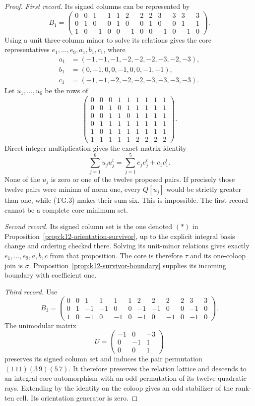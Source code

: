 \begin{proof}
\emph{First record.}
Its signed columns can be represented by
\[
B_1=\begin{pmatrix}
0&0&1&1&1&2&2&2&3&3&3&3\\
0&1&0&0&1&0&0&1&0&0&1&1\\
1&0&-1&0&0&-1&0&0&-1&0&-1&0
\end{pmatrix}.
\]
Using a unit three-column minor to solve its relations gives
the core representatives $e_1,\ldots,e_9,a_1,b_1,c_1$, where
\[
\begin{split}
a_1&=(-1,-1,-1,-2,-2,-2,-3,-2,-3),\\
b_1&=(0,-1,0,0,-1,0,0,-1,-1),\\
c_1&=(-1,-1,-2,-2,-2,-3,-3,-3,-3).
\end{split}
\]
Let $u_1,\ldots,u_6$ be the rows of
\[
\begin{pmatrix}
0&0&0&1&1&1&1&1&1\\
0&0&1&0&1&1&1&1&1\\
0&0&1&1&0&1&1&1&1\\
0&1&1&1&1&1&1&1&1\\
1&0&1&1&1&1&1&1&1\\
1&1&1&1&1&2&2&2&2
\end{pmatrix}.
\]
Direct integer multiplication gives the exact matrix identity
\[
 \sum_{j=1}^6u_ju_j^t
     =\sum_{j=1}^5e_je_j^t+c_1c_1^t.                   \tag{TG.3}
\]
None of the $u_j$ is zero or one of the twelve proposed pairs.
If precisely those twelve pairs were minima of norm one,
every $Q[u_j]$ would be strictly greater than one, while
(TG.3) makes their sum six. This is impossible. The first
record cannot be a complete core minimum set.

\emph{Second record.}
Its signed column set is the one denoted $(*)$ in
Proposition~\ref{prop:k12-orientation-survivor}, up to the
explicit integral basis change and ordering checked there.
Solving its unit-minor relations gives exactly
$e_1,\ldots,e_9,a,b,c$ from that proposition. The core is
therefore $\tau$ and its one-coloop join is $\sigma$.
Proposition~\ref{prop:k12-survivor-boundary} supplies its
incoming boundary with coefficient one.

\emph{Third record.}
Use
\[
B_3=\begin{pmatrix}
0&0&1&1&1&1&2&2&2&2&3&3\\
0&1&-1&-1&0&0&-1&-1&0&0&-1&0\\
1&0&-1&0&-1&0&-1&0&-1&0&-1&0
\end{pmatrix}.
\]
The unimodular matrix
\[
 U=\begin{pmatrix}-1&0&-3\\0&-1&1\\0&0&1\end{pmatrix}
\]
preserves its signed column set and induces the pair permutation
$(1\,11)(3\,9)(5\,7)$. It therefore preserves the relation
lattice and descends to an integral core automorphism with
an odd permutation of its twelve quadratic rays. Extending
by the identity on the coloop gives an odd stabilizer of
the rank-ten cell. Its orientation generator is zero.


\end{proof}
